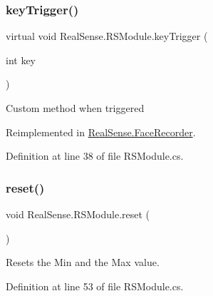 \mbox{\label{class_real_sense_1_1_r_s_module_a72f31ae62486b23d17e1a04c902a21c5}} 
\subsubsection{\texorpdfstring{key\+Trigger()}{keyTrigger()}}
{\footnotesize\ttfamily virtual void Real\+Sense.\+R\+S\+Module.\+key\+Trigger (\begin{DoxyParamCaption}\item[{int}]{key }\end{DoxyParamCaption})\hspace{0.3cm}{\ttfamily [virtual]}}

Custom method when triggered 

Reimplemented in \hyperlink{class_real_sense_1_1_face_recorder_aedf8a394ed84e2e4c3d82d050e457542}{Real\+Sense.\+Face\+Recorder}.



Definition at line 38 of file R\+S\+Module.\+cs.

\mbox{\label{class_real_sense_1_1_r_s_module_a8102b36be1a741846ed45f8ec277c577}} 
\subsubsection{\texorpdfstring{reset()}{reset()}}
{\footnotesize\ttfamily void Real\+Sense.\+R\+S\+Module.\+reset (\begin{DoxyParamCaption}{ }\end{DoxyParamCaption})}

Resets the Min and the Max value. 

Definition at line 53 of file R\+S\+Module.\+cs.

\mbox{\label{class_real_sense_1_1_r_s_module_a2ec830b7932ee7c0077d473f81c73867}} 
